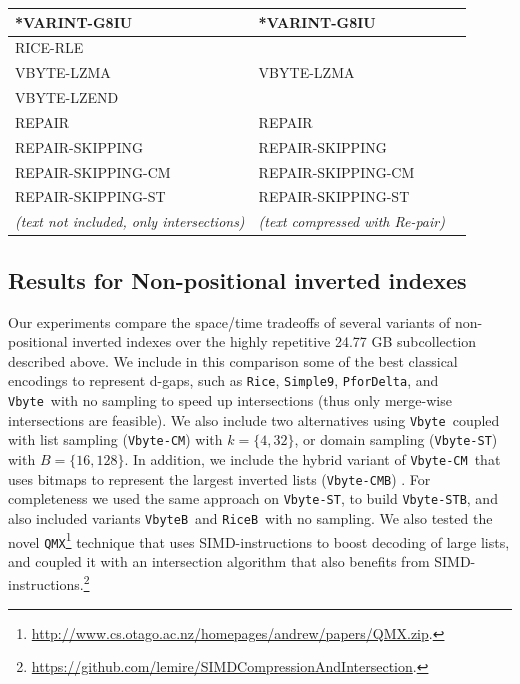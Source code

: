 \documentclass[review]{elsarticle}
\newcommand{\vbyte}{\texttt{Vbyte}}
\newcommand{\vbyteB}{\texttt{VbyteB}}
\newcommand{\rice}{\texttt{Rice}}
\newcommand{\riceB}{\texttt{RiceB}}
\newcommand{\simplen}{\texttt{Simple9}}
\newcommand{\pfordelta}{\texttt{PforDelta}}
\newcommand{\qmx}{\texttt{QMX}}
\newcommand{\vbyteCM}{\texttt{Vbyte-CM}}
\newcommand{\vbyteCMB}{\texttt{Vbyte-CMB}}
\newcommand{\vbyteST}{\texttt{Vbyte-ST}}
\newcommand{\vbyteSTB}{\texttt{Vbyte-STB}}
\begin{document}
\begin{table}[htbp]
\begin{center}
\begin{tabular}{|l|l|l|}
	*VARINT-G8IU              &  *VARINT-G8IU            &             \\ \hline
	RICE-RLE                  &                          &             \\ \hline
	VBYTE-LZMA                &  VBYTE-LZMA              &             \\ \hline
	VBYTE-LZEND               &                          &             \\ \hline
	REPAIR                    &  REPAIR                  &             \\ \hline
	REPAIR-SKIPPING           &  REPAIR-SKIPPING         &             \\ \hline
	REPAIR-SKIPPING-CM        &  REPAIR-SKIPPING-CM      &             \\ \hline
	REPAIR-SKIPPING-ST        &  REPAIR-SKIPPING-ST      &             \\ \hline
	\hline
	\textit{(text not included, only intersections)} & \textit{(text compressed with Re-pair)} &  \\ 
		\hline
	\end{tabular}
	\label{tab:techniques}
	\end{center}
\end{table}





\subsection{Results for Non-positional inverted indexes}

Our experiments compare the space/time tradeoffs of several variants of 
non-positional inverted indexes over the highly repetitive 24.77 GB subcollection described above. We include in this comparison some of the best classical encodings to represent d-gaps, such as \rice, \simplen, 
\pfordelta, and \vbyte\ with no sampling to speed up intersections (thus only merge-wise intersections are feasible). 
We also include two alternatives using \vbyte\ coupled with list sampling \cite{CM10} (\vbyteCM) with $k=\{4,32\}$, or domain sampling \cite{TS10} (\vbyteST) with $B=\{16,128\}$. In addition, we include the hybrid variant of \vbyteCM\ that uses bitmaps to represent the largest inverted lists (\vbyteCMB) \cite{CM10}. For completeness we used the same approach on \vbyteST, to build \vbyteSTB, and also included variants \vbyteB\ and \riceB\ with no sampling.
We also tested the novel \qmx\footnote{\url{http://www.cs.otago.ac.nz/homepages/andrew/papers/QMX.zip}. } technique \cite{trotman2014} that uses SIMD-instructions to boost decoding of large lists, and coupled it with an intersection algorithm \cite{Lemire2015:simdInt} that also benefits from SIMD-instructions.\footnote{ \url{https://github.com/lemire/SIMDCompressionAndIntersection}. }
\end{document}

